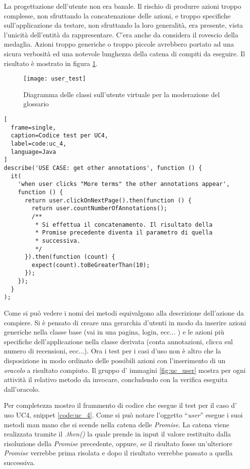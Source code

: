 La progettazione dell'utente non era banale. Il rischio di produrre azioni
troppo complesse, non sfruttando la concatenazione delle azioni, e troppo
specifiche sull'applicazione da testare, non sfruttando la loro generalità,
era presente, vista l'unicità dell'entità da rappresentare. C'era anche da
considera il rovescio della medaglia. Azioni troppo generiche o troppo piccole
avrebbero portato ad una sicura verbosità ed una notevole lunghezza della catena
di compiti da eseguire. Il risultato è mostrato in figura \ref{fig:user_test}.

\begin{figure}[H]
\begin{center}
\texttt{[image: user\_test]}
\caption{
Diagramma delle classi sull'utente virtuale per la moderazione del glossario
}
\label{fig:user_test}
\end{center}
\end{figure}

\begin{center}
\begin{lstlisting}[
  frame=single,
  caption=Codice test per UC4,
  label=code:uc_4,
  language=Java
]
describe('USE CASE: get other annotations', function () {
  it(
    'when user clicks "More terms" the other annotations appear',
    function () {
      return user.clickOnNextPage().then(function () {
        return user.countNumberOfAnnotations();
        /**
         * Si effettua il concatenamento. Il risultato della
         * Promise precedente diventa il parametro di quella
         * successiva.
         */
      }).then(function (count) {
        expect(count).toBeGreaterThan(10);
      });
    });
  }
);
\end{lstlisting}
\end{center}

Come si può vedere i nomi dei metodi equivalgono alla descrizione dell'azione
da compiere. Si è pensato di creare una gerarchia d'utenti in modo
da inserire azioni generiche nella classe base (vai in una pagina, login, ecc...
) e le azioni più specifiche dell'applicazione nella classe derivata (conta
annotazioni, clicca sul numero di recensioni, ecc...). Ora i test per i casi
d'uso non è altro che la disposizione in modo ordinato delle possibili azioni
con l'inserimento di un \textit{oracolo} a risultato compiuto. Il gruppo d'
immagini \ref{fig:uc_user} mostra per ogni attività il relativo metodo da
invocare, concludendo con la verifica eseguita dall'oracolo.

Per completezza mostro il frammento di codice che esegue il test per il caso d'
uso UC4, snippet \ref{code:uc_4}. Come si può notare l'oggetto ``\textit{user}''
esegue i suoi metodi man mano che si scende nella catena delle \textit{Promise}.
La catena viene realizzata tramite il \textit{.then()} la quale prende in input
il valore restituito dalla risoluzione della \textit{Promise} precedente,
oppure, se il risultato fosse un'ulteriore \textit{Promise} verrebbe prima
risolata e dopo il risultato verrebbe passato a quella successiva.

